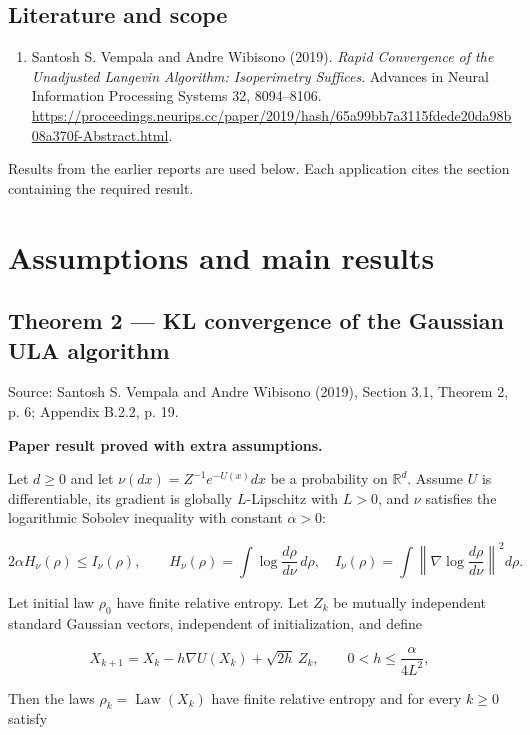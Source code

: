 \documentclass[11pt,a4paper]{report}
\begin{document}
\section*{Literature and scope}
\begin{enumerate}
\item Santosh S. Vempala and Andre Wibisono (2019). \emph{Rapid Convergence of the Unadjusted Langevin Algorithm: Isoperimetry Suffices}. Advances in Neural Information Processing Systems 32, 8094–8106. \url{https://proceedings.neurips.cc/paper/2019/hash/65a99bb7a3115fdede20da98b08a370f-Abstract.html}.
\end{enumerate}
Results from the earlier reports \cite{LangevinLean2026ULASC} are used below. Each application cites the section containing the required result.

\tableofcontents
\clearpage
{}
\chapter{Assumptions and main results}
\section{\texorpdfstring{Theorem 2 — KL convergence of the Gaussian ULA algorithm}{Theorem 2 — KL convergence of the Gaussian ULA algorithm}}


Source: Santosh S. Vempala and Andre Wibisono (2019), Section 3.1, Theorem 2, p. 6; Appendix B.2.2, p. 19.



\textbf{Paper result proved with extra assumptions.}



Let \(d\ge0\) and let \(\nu(dx)=Z^{-1}e^{-U(x)}dx\) be a probability on \(\mathbb R^d\). Assume \(U\) is differentiable, its gradient is globally \(L\)-Lipschitz with \(L>0\), and \(\nu\) satisfies the logarithmic Sobolev inequality with constant \(\alpha>0\):

\[2\alpha H_\nu(\rho)\le I_\nu(\rho),\qquad
H_\nu(\rho)=\int\log\frac{d\rho}{d\nu}\,d\rho,\quad
I_\nu(\rho)=\int\left\|\nabla\log\frac{d\rho}{d\nu}\right\|^2d\rho.\]

Let initial law \(\rho_0\) have finite relative entropy. Let \(Z_k\) be mutually independent standard Gaussian vectors, independent of initialization, and define

\[X_{k+1}=X_k-h\nabla U(X_k)+\sqrt{2h}\,Z_k,
\qquad 0<h\le\frac{\alpha}{4L^2},\]

Then the laws \(\rho_k=\operatorname{Law}(X_k)\) have finite relative entropy and for every \(k\ge0\) satisfy
\end{document}
